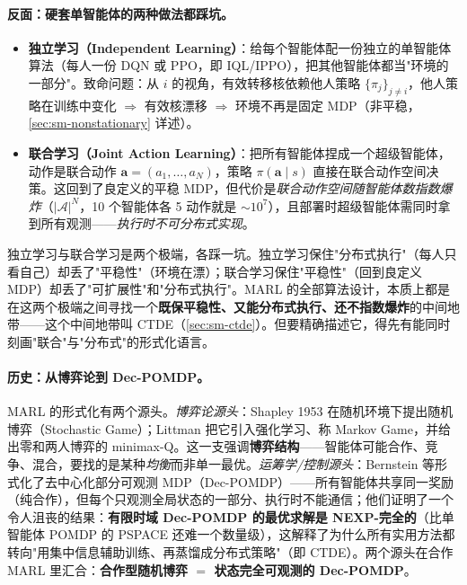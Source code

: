 \paragraph{反面：硬套单智能体的两种做法都踩坑。}
\begin{itemize}
  \item \textbf{独立学习（Independent Learning）}：给每个智能体配一份独立的单智能体算法（每人一份 DQN 或 PPO，即 IQL/IPPO），把其他智能体都当"环境的一部分"。致命问题：从 $i$ 的视角，有效转移核依赖他人策略 $\{\pi_j\}_{j\neq i}$，他人策略在训练中变化 $\Rightarrow$ 有效核漂移 $\Rightarrow$ 环境不再是固定 MDP（非平稳，\cref{sec:sm-nonstationary} 详述）。
  \item \textbf{联合学习（Joint Action Learning）}：把所有智能体捏成一个超级智能体，动作是联合动作 $\mathbf{a}=(a_1,\dots,a_N)$，策略 $\pi(\mathbf{a}\mid s)$ 直接在联合动作空间决策。这回到了良定义的平稳 MDP，但代价是\emph{联合动作空间随智能体数指数爆炸}（$|\mathcal{A}|^N$，10 个智能体各 5 动作就是 $\sim10^7$），且部署时超级智能体需同时拿到所有观测——\emph{执行时不可分布式实现}。
\end{itemize}

\begin{insight}
独立学习与联合学习是两个极端，各踩一坑。独立学习保住"分布式执行"（每人只看自己）却丢了"平稳性"（环境在漂）；联合学习保住"平稳性"（回到良定义 MDP）却丢了"可扩展性"和"分布式执行"。MARL 的全部算法设计，本质上都是在这两个极端之间寻找一个\textbf{既保平稳性、又能分布式执行、还不指数爆炸}的中间地带——这个中间地带叫 CTDE（\cref{sec:sm-ctde}）。但要精确描述它，得先有能同时刻画"联合"与"分布式"的形式化语言。
\end{insight}

\paragraph{历史：从博弈论到 Dec-POMDP。}
MARL 的形式化有两个源头。\emph{博弈论源头}：Shapley 1953 在随机环境下提出随机博弈（Stochastic Game）；Littman 把它引入强化学习、称 Markov Game，并给出零和两人博弈的 minimax-Q\cite{littman1994markov}。这一支强调\textbf{博弈结构}——智能体可能合作、竞争、混合，要找的是某种\emph{均衡}而非单一最优。\emph{运筹学/控制源头}：Bernstein 等形式化了去中心化部分可观测 MDP（Dec-POMDP）\cite{bernstein2002decpomdp}——所有智能体共享同一奖励（纯合作），但每个只观测全局状态的一部分、执行时不能通信；他们证明了一个令人沮丧的结果：\textbf{有限时域 Dec-POMDP 的最优求解是 NEXP-完全的}（比单智能体 POMDP 的 PSPACE 还难一个数量级），这解释了为什么所有实用方法都转向"用集中信息辅助训练、再蒸馏成分布式策略"（即 CTDE）。两个源头在合作 MARL 里汇合：\textbf{合作型随机博弈 $=$ 状态完全可观测的 Dec-POMDP}。

